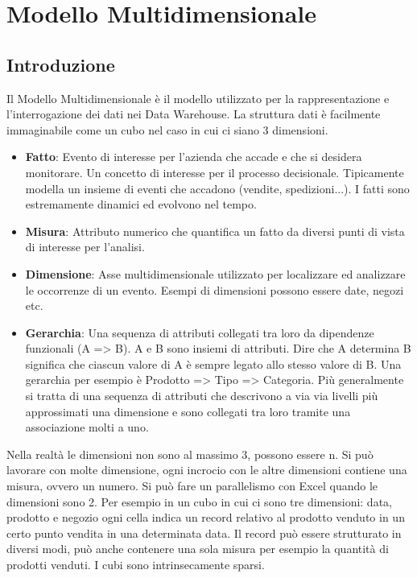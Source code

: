 
\section{Modello Multidimensionale}
\subsection{Introduzione}
Il Modello Multidimensionale è il modello utilizzato per la rappresentazione e l'interrogazione dei dati nei Data Warehouse. La struttura dati è facilmente immaginabile come un cubo nel caso in cui ci siano 3 dimensioni.
\begin{itemize}
	\item \textbf{Fatto}: Evento di interesse per l'azienda che accade e che si desidera monitorare. Un concetto di interesse per il processo decisionale. Tipicamente modella un insieme di eventi che accadono (vendite, spedizioni...). I fatti sono estremamente dinamici ed evolvono nel tempo.
	\item \textbf{Misura}: Attributo numerico che quantifica un fatto da diversi punti di vista di interesse per l'analisi.
	\item \textbf{Dimensione}: Asse multidimensionale utilizzato per localizzare ed analizzare le occorrenze di un evento. Esempi di dimensioni possono essere date, negozi etc.
	\item \textbf{Gerarchia}: Una sequenza di attributi collegati tra loro da dipendenze funzionali (A => B).
	A e B sono insiemi di attributi. Dire che A determina B significa che ciascun valore di A è sempre legato allo stesso valore di B.
	Una gerarchia per esempio è Prodotto => Tipo => Categoria.
	Più generalmente si tratta di una sequenza di attributi che descrivono a via via livelli più approssimati una dimensione e sono collegati tra loro tramite una associazione molti a uno.
\end{itemize}
\noindent Nella realtà le dimensioni non sono al massimo 3, possono essere n. Si può lavorare con molte dimensione, ogni incrocio con le altre dimensioni contiene una misura, ovvero un numero. Si può fare un parallelismo con Excel quando le dimensioni sono 2.\newline
Per esempio in un cubo in cui ci sono tre dimensioni: data, prodotto e negozio ogni cella indica un record relativo al prodotto venduto in un certo punto vendita in una determinata data. Il record può essere strutturato in diversi modi, può anche contenere una sola misura per esempio la quantità di prodotti venduti.\newline
I cubi sono intrinsecamente sparsi.\newline
